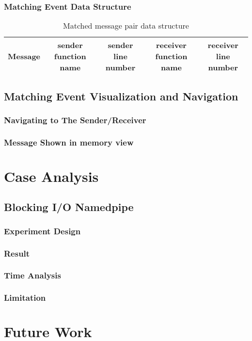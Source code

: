 \documentclass[paper=a4, fontsize=11pt]{scrartcl}
\numberwithin{equation}{section}		%
\numberwithin{figure}{section}			%
\numberwithin{table}{section}				%
\begin{document}
\subsubsection{Matching Event Data Structure}
\begin{table}[h]
 \begin{center}
  \caption{Matched message pair data structure}
\label{table2}
\begin{tabular}{|c|c|c|c|c|}
      \hline
         Message& sender function name & sender line number  & receiver function name & receiver line number \\
       \hline
\end{tabular}
\end{center}
\end{table}
\subsection{Matching Event Visualization and Navigation}
\subsubsection{Navigating to The Sender/Receiver}
\subsubsection{Message Shown in memory view}



\section{Case Analysis}
\subsection{Blocking I/O Namedpipe}
\subsubsection{Experiment Design}
\subsubsection{Result}
\subsubsection{Time Analysis}
\subsubsection{Limitation}

\section{Future Work}



 


\end{document}
